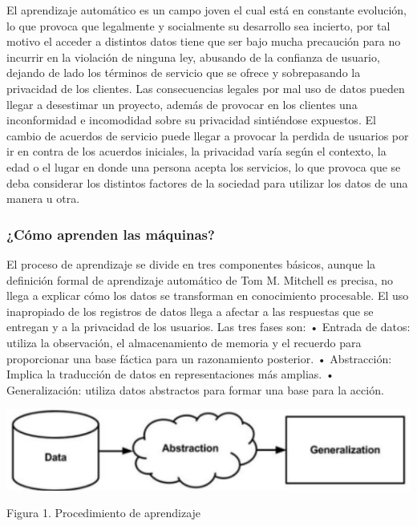\documentclass[
  letterpaper,
  DIV=11,
  numbers=noendperiod]{scrartcl}
\begin{document}
El aprendizaje automático es un campo joven el cual está en constante
evolución, lo que provoca que legalmente y socialmente su desarrollo sea
incierto, por tal motivo el acceder a distintos datos tiene que ser bajo
mucha precaución para no incurrir en la violación de ninguna ley,
abusando de la confianza de usuario, dejando de lado los términos de
servicio que se ofrece y sobrepasando la privacidad de los clientes. Las
consecuencias legales por mal uso de datos pueden llegar a desestimar un
proyecto, además de provocar en los clientes una inconformidad e
incomodidad sobre su privacidad sintiéndose expuestos. El cambio de
acuerdos de servicio puede llegar a provocar la perdida de usuarios por
ir en contra de los acuerdos iniciales, la privacidad varía según el
contexto, la edad o el lugar en donde una persona acepta los servicios,
lo que provoca que se deba considerar los distintos factores de la
sociedad para utilizar los datos de una manera u otra.

\hypertarget{cuxf3mo-aprenden-las-muxe1quinas}{%
\subsubsection{¿Cómo aprenden las
máquinas?}\label{cuxf3mo-aprenden-las-muxe1quinas}}

El proceso de aprendizaje se divide en tres componentes básicos, aunque
la definición formal de aprendizaje automático de Tom M. Mitchell es
precisa, no llega a explicar cómo los datos se transforman en
conocimiento procesable. El uso inapropiado de los registros de datos
llega a afectar a las respuestas que se entregan y a la privacidad de
los usuarios. Las tres fases son: • Entrada de datos: utiliza la
observación, el almacenamiento de memoria y el recuerdo para
proporcionar una base fáctica para un razonamiento posterior. •
Abstracción: Implica la traducción de datos en representaciones más
amplias. • Generalización: utiliza datos abstractos para formar una base
para la acción.

\begin{Figura 1. Procedimiento de aprendizaje}

{\centering \includegraphics{cap1.png}

}

\caption{Figura 1. Procedimiento de aprendizaje}

\end{Figura 1. Procedimiento de aprendizaje}
\end{document}
